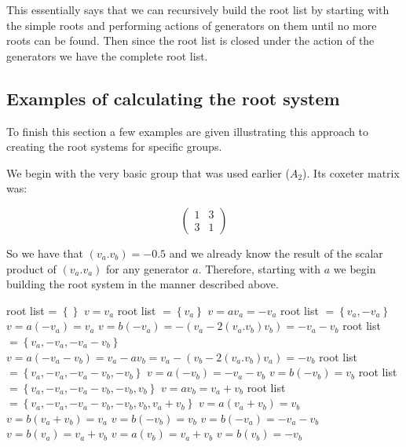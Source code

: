 \documentclass[a4paper,12pt]{article}
\begin{document}
This essentially says that we can recursively build the root list by starting with the simple roots and performing actions of generators on them until no more roots can be found. Then since the root list is closed under the action of the generators we have the complete root list.

\subsection{Examples of calculating the root system}
To finish this section a few examples are given illustrating this approach to creating the root systems for specific groups.

\begin{example}
We begin with the very basic group that was used earlier ($A_2$). Its coxeter matrix was: 
	
\[ \left( \begin{array}{cc}
1 & 3 \\
3 & 1
\end{array} \right) \]

So we have that $(v_a.v_b) = -0.5$ and we already know the result of the scalar product of $(v_a.v_a)$ for any generator $a$. Therefore, starting with $a$ we begin building the root system in the manner described above.

\begin{algorithmic}[1]
	\STATE root list = $\left\{\right\}$
	\STATE $v = v_a$
	\STATE root list $= \left\{v_a\right\}$
	\STATE $v = av_a = -v_a$
	\STATE root list $= \left\{v_a, -v_a\right\}$
	\STATE $v = a(-v_a) = v_a$ 
	\STATE $v = b(-v_a) = -(v_a - 2(v_a.v_b)v_b) = -v_a - v_b$
	\STATE root list $= \left\{v_a, -v_a, -v_a - v_b\right\}$
	\STATE $v = a(-v_a - v_b) = v_a - av_b = v_a - (v_b - 2(v_a.v_b)v_a) = -v_b$
	\STATE root list $= \left\{v_a, -v_a, -v_a - v_b, -v_b\right\}$
	\STATE $v = a(-v_b) = -v_a - v_b$ 
	\STATE $v = b(-v_b) = v_b$
	\STATE root list $= \left\{v_a, -v_a, -v_a - v_b, -v_b, v_b\right\}$
	\STATE $v = av_b = v_a + v_b$
	\STATE root list $= \left\{v_a, -v_a, -v_a - v_b, -v_b, v_b, v_a + v_b\right\}$
	\STATE $v = a(v_a + v_b) = v_b$
	\STATE $v = b(v_a + v_b) = v_a$ 
	\STATE $v = b(-v_b) = v_b$ 
	\STATE $v = b(-v_a) = -v_a - v_b$ 
	\STATE $v = b(v_a) = v_a + v_b$ 
	\STATE $v = a(v_b) = v_a + v_b$
	\STATE $v = b(v_b) = -v_b$	
\end{algorithmic}


\end{example}
\end{document}
